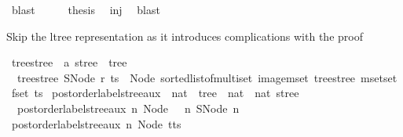 \begin{isabellebody}
\ blast\isanewline
\ \ \isamarkupfalse%
\ \isamarkupfalse%
\ {\isacharquery}{\kern0pt}thesis\ \isamarkupfalse%
\ inj\ \isamarkupfalse%
\ blast\isanewline
{}\isamarkupfalse%
%
\endisatagproof
{\isafoldproof}%
%
\isadelimproof
%
\endisadelimproof
%
\begin{isamarkuptext}%
Skip the ltree representation as it introduces complications with the proof%
\end{isamarkuptext}\isamarkuptrue%
\isamarkupfalse%
\ tree{\isacharunderscore}{\kern0pt}stree\ {\isacharcolon}{\kern0pt}{\isacharcolon}{\kern0pt}\ {\isachardoublequoteopen}{\isacharprime}{\kern0pt}a\ stree\ {\isasymRightarrow}\ tree{\isachardoublequoteclose}\ \isanewline
\ \ {\isachardoublequoteopen}tree{\isacharunderscore}{\kern0pt}stree\ {\isacharparenleft}{\kern0pt}SNode\ r\ ts{\isacharparenright}{\kern0pt}\ {\isacharequal}{\kern0pt}\ Node\ {\isacharparenleft}{\kern0pt}sorted{\isacharunderscore}{\kern0pt}list{\isacharunderscore}{\kern0pt}of{\isacharunderscore}{\kern0pt}multiset\ {\isacharparenleft}{\kern0pt}image{\isacharunderscore}{\kern0pt}mset\ tree{\isacharunderscore}{\kern0pt}stree\ {\isacharparenleft}{\kern0pt}mset{\isacharunderscore}{\kern0pt}set\ {\isacharparenleft}{\kern0pt}fset\ ts{\isacharparenright}{\kern0pt}{\isacharparenright}{\kern0pt}{\isacharparenright}{\kern0pt}{\isacharparenright}{\kern0pt}{\isachardoublequoteclose}\isanewline
\isanewline
{}\isamarkupfalse%
\ postorder{\isacharunderscore}{\kern0pt}label{\isacharunderscore}{\kern0pt}stree{\isacharunderscore}{\kern0pt}aux\ {\isacharcolon}{\kern0pt}{\isacharcolon}{\kern0pt}\ {\isachardoublequoteopen}nat\ {\isasymRightarrow}\ tree\ {\isasymRightarrow}\ nat\ {\isasymtimes}\ nat\ stree{\isachardoublequoteclose}\ \isanewline
\ \ {\isachardoublequoteopen}postorder{\isacharunderscore}{\kern0pt}label{\isacharunderscore}{\kern0pt}stree{\isacharunderscore}{\kern0pt}aux\ n\ {\isacharparenleft}{\kern0pt}Node\ {\isacharbrackleft}{\kern0pt}{\isacharbrackright}{\kern0pt}{\isacharparenright}{\kern0pt}\ {\isacharequal}{\kern0pt}\ {\isacharparenleft}{\kern0pt}n{\isacharcomma}{\kern0pt}\ SNode\ n\ {\isacharbraceleft}{\kern0pt}{\isacharbar}{\kern0pt}{\isacharbar}{\kern0pt}{\isacharbraceright}{\kern0pt}{\isacharparenright}{\kern0pt}{\isachardoublequoteclose}\isanewline
{\isacharbar}{\kern0pt}\ {\isachardoublequoteopen}postorder{\isacharunderscore}{\kern0pt}label{\isacharunderscore}{\kern0pt}stree{\isacharunderscore}{\kern0pt}aux\ n\ {\isacharparenleft}{\kern0pt}Node\ {\isacharparenleft}{\kern0pt}t{\isacharhash}{\kern0pt}ts{\isacharparenright}{\kern0pt}{\isacharparenright}{\kern0pt}\ {\isacharequal}{\kern0pt}\isanewline

\end{isabellebody}
